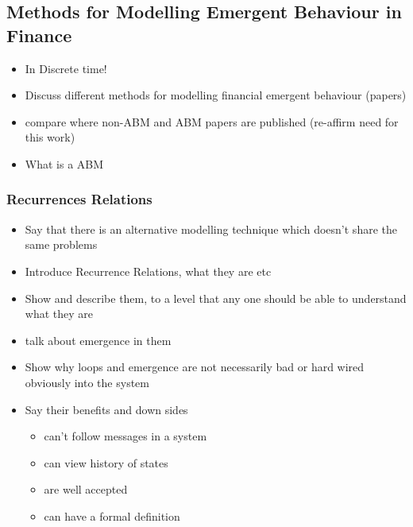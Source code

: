 \documentclass{article}
\begin{document}
\subsection{Methods for Modelling Emergent Behaviour in Finance}
\begin{itemize}
  \item In Discrete time!
  \item Discuss different methods for modelling financial emergent behaviour (papers)
  \item compare where non-ABM and ABM papers are published (re-affirm need for this work)
  \item  What is a ABM 
\end{itemize}

\subsubsection{Recurrences Relations} 

\begin{itemize}
  \item Say that there is an alternative modelling technique which doesn't share the same problems 
  \item Introduce Recurrence Relations, what they are etc 
  \item Show and describe them, to a level that any one should be able to understand what they are 
  \item talk about emergence in them
  \item Show why loops and emergence are not necessarily bad or hard wired obviously into the system
  \item Say their benefits and down sides  \begin{itemize}
  \item can't follow messages in a system
  \item can view history of states 
  \item are well accepted 
  \item can have a formal definition 
\end{itemize}
\end{itemize}
\end{document}
